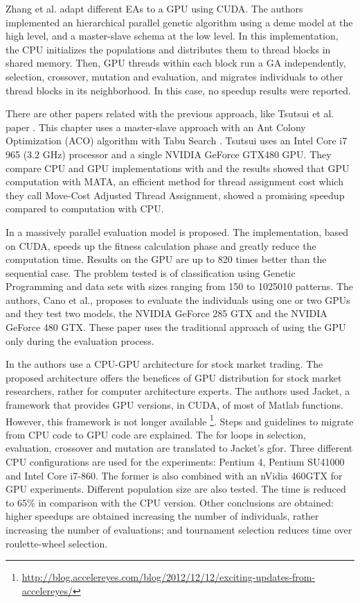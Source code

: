 \documentclass[prodmode,acmtecs]{acmsmall}
\begin{document}
Zhang et al. \cite{ZhangImplementationMasterSlave} adapt different EAs to a GPU using CUDA. The authors implemented an hierarchical parallel genetic algorithm using a deme model at the high level, and a master-slave schema at the low level. In this implementation, the CPU initializes the populations and distributes them to thread blocks in shared memory. Then, GPU threads within each block run a GA independently, selection, crossover, mutation and evaluation, and migrates individuals to other thread blocks in its neighborhood. In this case, no speedup results were reported.

There are other papers related with the previous approach, like Tsutsui et al. paper \cite{Tsutsui:2011:GECCO}. This chapter uses a master-slave approach with an Ant Colony Optimization (ACO) algorithm \cite{Dorigo:1999:ACO:329055_329062} with Tabu Search \cite{Glover:1997:TS:549765}. Tsutsui uses an Intel Core i7 965 (3.2 GHz) processor and a single NVIDIA GeForce GTX480 GPU. They compare CPU and GPU implementations with and the results showed that GPU computation with MATA, an efficient method for thread assignment cost which they call Move-Cost Adjusted Thread Assignment, showed a promising speedup compared to computation with CPU.

In \cite{Cano:2012:SUE:2150467.2150468} a massively parallel evaluation model is proposed. The implementation, based on CUDA, speeds up the fitness calculation phase and greatly reduce the computation time. Results on the GPU are up to 820 times better than the sequential case. The problem tested is of classification using Genetic Programming and data sets with sizes ranging from 150 to 1025010 patterns. The authors, Cano et al., proposes to evaluate the individuals using one or two GPUs and they test two models, the NVIDIA GeForce 285 GTX and the NVIDIA GeForce 480 GTX. These paper uses the traditional approach of using the GPU only during the evaluation process.

In \cite{Contreras:2012:UGA:2150467.2150469} the authors use a CPU-GPU architecture for stock market trading. The proposed architecture offers the benefices of GPU distribution for stock market researchers, rather for computer architecture experts. The authors used Jacket, a framework that provides GPU versions, in CUDA, of most of Matlab functions. However, this framework is not longer available \footnote{\url{http://blog.accelereyes.com/blog/2012/12/12/exciting-updates-from-accelereyes/}}. Steps and guidelines to migrate from CPU code to GPU code are explained. The for loops in selection, evaluation, crossover and mutation are translated to Jacket's gfor. Three different CPU configurations are used for the experiments: Pentium 4, Pentium SU41000 and Intel Core i7-860. The former is also combined with an nVidia 460GTX for GPU experiments. Different population size are also tested. The time is reduced to 65\% in comparison with the CPU version. Other conclusions are obtained: higher speedups are obtained increasing the number of individuals, rather increasing the number of evaluations; and tournament selection reduces time over roulette-wheel selection. %
\end{document}
